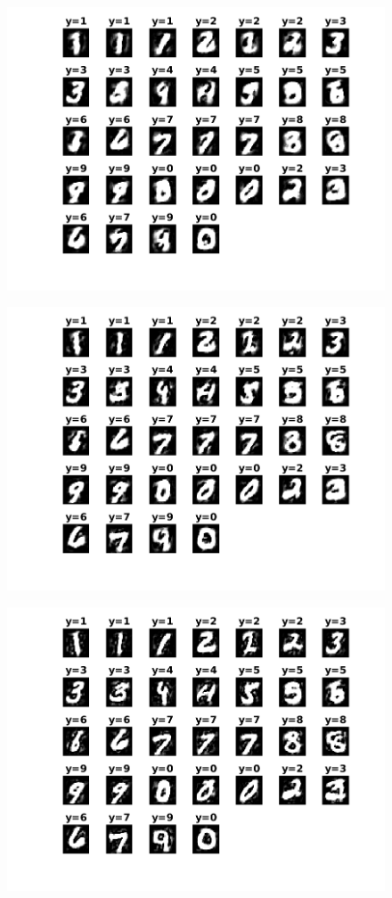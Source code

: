 \documentclass{article}
\begin{document}
\begin{figure}[h!]
\begin{multicols}{3}
\includegraphics[width=1\columnwidth]{RunResults2/10.png}
\label{10}
\end{multicols}
\centering
\begin{multicols}{2}
\includegraphics[width=0.65\columnwidth]{RunResults2/11.png}
\label{11}

\includegraphics[width=0.65\columnwidth]{RunResults2/12.png}
\label{12}

\end{multicols}
\end{figure}
\newpage
\end{document}
